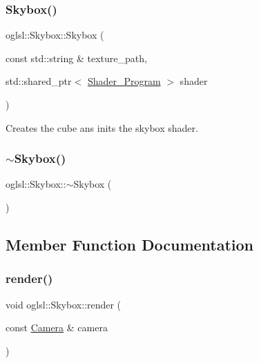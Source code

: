 \subsubsection{\texorpdfstring{Skybox()}{Skybox()}}
{\footnotesize\ttfamily oglsl\+::\+Skybox\+::\+Skybox (\begin{DoxyParamCaption}\item[{const std\+::string \&}]{texture\+\_\+path,  }\item[{std\+::shared\+\_\+ptr$<$ \mbox{\hyperlink{classoglsl_1_1_shader___program}{Shader\+\_\+\+Program}} $>$}]{shader }\end{DoxyParamCaption})}



Creates the cube ans inits the skybox shader. 

\mbox{\label{classoglsl_1_1_skybox_ae49b37d4211f0f6f3fb7de0199324a3f}} 
\subsubsection{\texorpdfstring{$\sim$\+Skybox()}{~Skybox()}}
{\footnotesize\ttfamily oglsl\+::\+Skybox\+::$\sim$\+Skybox (\begin{DoxyParamCaption}{ }\end{DoxyParamCaption})}



\subsection{Member Function Documentation}
\mbox{\label{classoglsl_1_1_skybox_a2ee558805867f1acdfab64f689c41f76}} 
\subsubsection{\texorpdfstring{render()}{render()}}
{\footnotesize\ttfamily void oglsl\+::\+Skybox\+::render (\begin{DoxyParamCaption}\item[{const \mbox{\hyperlink{classoglsl_1_1_camera}{Camera}} \&}]{camera }\end{DoxyParamCaption})}



